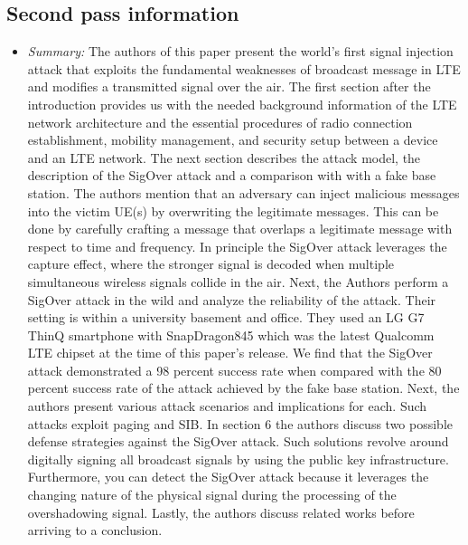 \documentclass[letterpaper,twocolumn,10pt]{article}
\begin{document}
\subsection{Second pass information}
\label{sec:second}
\begin{itemize}

\item {\it Summary:} 
The authors of this paper present the world's first signal injection attack that exploits the fundamental weaknesses 
of broadcast message in LTE and modifies a transmitted signal over the air. The first section after the introduction 
provides us with the needed background information of the LTE network architecture and the essential procedures 
of radio connection establishment, mobility management, and security setup between a device and an LTE network.
The next section describes the attack model, the description of the SigOver attack and a comparison with with a 
fake base station. The authors mention that an adversary can inject malicious messages into the victim UE(s) by
overwriting the legitimate messages. This can be done by carefully crafting a message that overlaps a legitimate
message with respect to time and frequency. In principle the SigOver attack leverages the capture effect, where 
the stronger signal is decoded when multiple simultaneous wireless signals collide in the air. Next, the Authors 
perform a SigOver attack in the wild and analyze the reliability of the attack. Their setting is within a university 
basement and office. They used an LG G7 ThinQ smartphone with SnapDragon845 which was the latest Qualcomm
LTE chipset at the time of this paper's release. We find that the SigOver attack demonstrated a 98 percent success 
rate when compared with the 80 percent success rate of the attack achieved by the fake base station. Next, the authors
present various attack scenarios and implications for each. Such attacks exploit paging and SIB. In section 6 the authors
discuss two possible defense strategies against the SigOver attack. Such solutions revolve around digitally signing all 
broadcast signals by using the public key infrastructure. Furthermore, you can detect the SigOver attack because
it leverages the changing nature of the physical signal during the processing of the overshadowing signal. Lastly,
the authors discuss related works before arriving to a conclusion.

\end{itemize}
\end{document}
